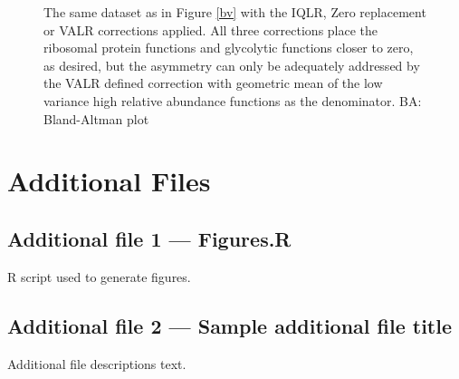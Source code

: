 \documentclass{bmcart}
\def\texttt{[image: ]}
\begin{document}
\begin{backmatter}
\begin{figure}[ht]
\caption{ The same dataset as in Figure \ref{bv} with the IQLR, Zero replacement or VALR corrections applied. All three corrections place the ribosomal protein functions and glycolytic functions closer to zero, as desired, but the asymmetry can only be adequately addressed by the VALR defined correction with geometric mean of the low variance high relative abundance functions as the denominator. BA: Bland-Altman plot }
\label{Fig:ribo}
\end{figure}



\section*{Additional Files}
  \subsection*{Additional file 1 --- Figures.R}
    R script used to generate figures. 

  \subsection*{Additional file 2 --- Sample additional file title}
    Additional file descriptions text.


\end{backmatter}
\end{document}
